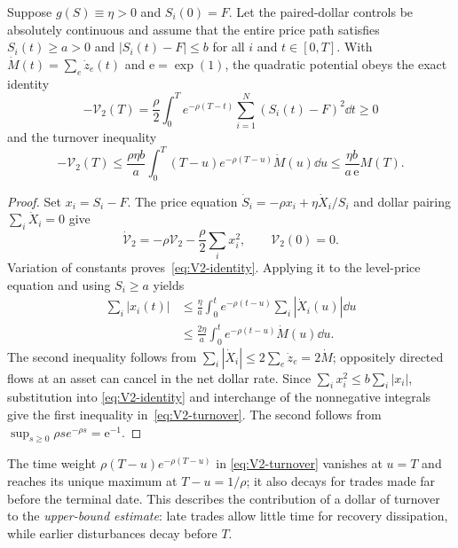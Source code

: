 \documentclass[review,hidelinks,onefignum,onetabnum]{siamonline250211}
\begin{document}
\begin{proposition}\label{prop:turnover-dissipation}
Suppose $g(S)\equiv\eta>0$ and $S_i(0)=F$. Let the paired-dollar controls
be absolutely continuous and assume that the entire price path satisfies
$S_i(t)\ge a>0$ and $|S_i(t)-F|\le b$ for all $i$ and $t\in[0,T]$.
With $\dot M(t)=\sum_e\dot z_e(t)$ and $\mathrm e=\exp(1)$, the quadratic
potential obeys the exact identity
\begin{equation}\label{eq:V2-identity}
-\mathcal V_2(T)=\frac{\rho}{2}\int_0^T
e^{-\rho(T-t)}\sum_{i=1}^N(S_i(t)-F)^2\dd t\ge0
\end{equation}
and the turnover inequality
\begin{equation}\label{eq:V2-turnover}
-\mathcal V_2(T)\le
\frac{\rho\eta b}{a}\int_0^T
(T-u)e^{-\rho(T-u)}\dot M(u)\dd u
\le\frac{\eta b}{a\,\mathrm e}M(T).
\end{equation}
\end{proposition}
\begin{proof}
Set $x_i=S_i-F$. The price equation
$\dot S_i=-\rho x_i+\eta\dot X_i/S_i$ and dollar pairing
$\sum_i\dot X_i=0$ give
\[
\dot{\mathcal V}_2
=-\rho\mathcal V_2-\frac{\rho}{2}\sum_i x_i^2,
\qquad \mathcal V_2(0)=0.
\]
Variation of constants proves~\eqref{eq:V2-identity}. Applying it to
the level-price equation and using $S_i\ge a$ yields
\[
\begin{aligned}
\sum_i|x_i(t)|
&\le\frac{\eta}{a}\int_0^t e^{-\rho(t-u)}
\sum_i|\dot X_i(u)|\dd u\\
&\le\frac{2\eta}{a}\int_0^t e^{-\rho(t-u)}
\dot M(u)\dd u.
\end{aligned}
\]
The second inequality follows from
$\sum_i|\dot X_i|\le2\sum_e\dot z_e=2\dot M$;
oppositely directed flows at an asset can cancel in the net dollar
rate. Since $\sum_i x_i^2\le b\sum_i|x_i|$, substitution into
\eqref{eq:V2-identity} and interchange of the nonnegative integrals give
the first inequality in~\eqref{eq:V2-turnover}. The second follows from
$\sup_{s\ge0}\rho s e^{-\rho s}=\mathrm e^{-1}$.
\end{proof}

The time weight $\rho(T-u)e^{-\rho(T-u)}$ in
\eqref{eq:V2-turnover} vanishes at $u=T$ and reaches its unique
maximum at $T-u=1/\rho$; it also decays for trades made far
before the terminal date. This describes the contribution of a
dollar of turnover to the \emph{upper-bound estimate}: late trades
allow little time for recovery dissipation, while earlier disturbances
decay before $T$. 
\end{document}
